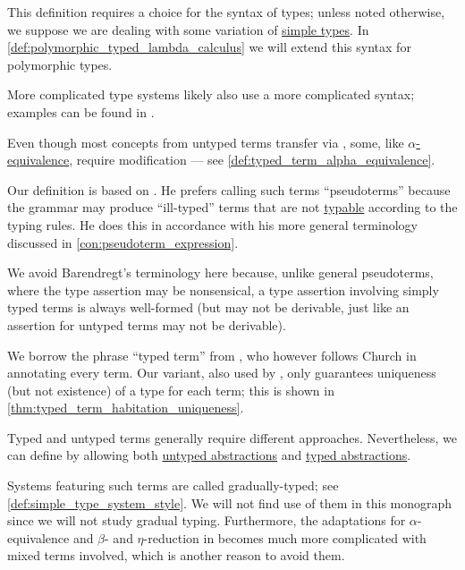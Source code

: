 \begin{comments}
  \item This definition requires a choice for the syntax of types; unless noted otherwise, we suppose we are dealing with some variation of \hyperref[def:simple_type]{simple types}. In \cref{def:polymorphic_typed_lambda_calculus} we will extend this syntax for polymorphic types.

  More complicated type systems likely also use a more complicated syntax; examples can be found in .

  \item Even though most concepts from untyped terms transfer via , some, like \hyperref[def:lambda_term_alpha_equivalence]{\( \alpha \)-equivalence}, require modification --- see \cref{def:typed_term_alpha_equivalence}.

  \item Our definition is based on . He prefers calling such terms \enquote{pseudoterms} because the grammar may produce \enquote{ill-typed} terms that are not \hyperref[def:typability]{typable} according to the typing rules. He does this in accordance with his more general terminology discussed in \cref{con:pseudoterm_expression}.

  We avoid Barendregt's terminology here because, unlike general pseudoterms, where the type assertion may be nonsensical, a type assertion involving simply typed terms is always well-formed (but may not be derivable, just like an assertion for untyped terms may not be derivable).

  We borrow the phrase \enquote{typed term} from , who however follows Church in annotating every term. Our variant, also used by , only guarantees uniqueness (but not existence) of a type for each term; this is shown in \cref{thm:typed_term_habitation_uniqueness}.
\end{comments}

\begin{remark}\label{rem:mixed_lambda_term}\mimprovised
  Typed and untyped terms generally require different approaches. Nevertheless, we can define  by allowing both \hyperref[def:lambda_term]{untyped abstractions} and \hyperref[def:typed_lambda_term]{typed abstractions}.

  Systems featuring such terms are called gradually-typed; see \cref{def:simple_type_system_style}. We will not find use of them in this monograph since we will not study gradual typing. Furthermore, the adaptations for \( \alpha \)-equivalence and \( \beta \)- and \( \eta \)-reduction in  becomes much more complicated with mixed terms involved, which is another reason to avoid them.
\end{remark}

